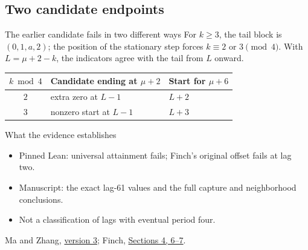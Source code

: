 \documentclass{beamer}
\begin{document}
\subsection{Two candidate endpoints}
\begin{frame}{The earlier candidate fails in two different ways}
  For $k\ge3$, the tail block is $(0,1,a,2)$; the position of
  the stationary step forces $k\equiv2$ or $3\pmod4$.
  With $L=\mu+2-k$, the indicators agree with the tail from $L$ onward.
  \medskip
  \begin{tabular}{c|ll}
    $k\bmod4$ & Candidate ending at $\mu+2$ & Start for $\mu+6$ \\
    \hline
    $2$ & extra zero at $L-1$ & $L+2$ \\
    $3$ & nonzero start at $L-1$ & $L+3$
  \end{tabular}
\end{frame}
\appendix
\begin{frame}{What the evidence establishes}
  \begin{itemize}
    \item Pinned Lean: universal attainment fails; Finch's original offset fails at lag two.
    \item Manuscript: the exact lag-61 values and the full capture and neighborhood conclusions.
    \item Not a classification of lags with eventual period four.
  \end{itemize}
  \small Ma and Zhang, \href{https://doi.org/10.5281/zenodo.24408308}{version 3};
  Finch, \href{https://arxiv.org/abs/2610.34300v1}{Sections 4, 6--7}.
\end{frame}
\FormalVerification
\end{document}
